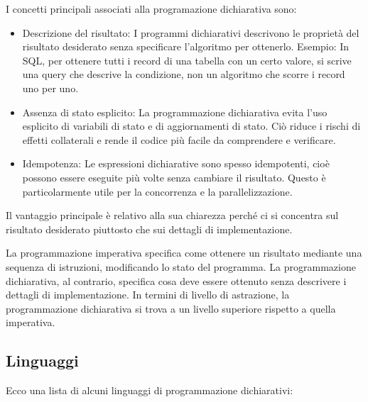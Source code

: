 \documentclass[
  letterpaper,
]{scrbook}
\begin{document}
I concetti principali associati alla programazione dichiarativa sono:

\begin{itemize}
\item
  Descrizione del risultato: I programmi dichiarativi descrivono le
  proprietà del risultato desiderato senza specificare l'algoritmo per
  ottenerlo. Esempio: In SQL, per ottenere tutti i record di una tabella
  con un certo valore, si scrive una query che descrive la condizione,
  non un algoritmo che scorre i record uno per uno.
\item
  Assenza di stato esplicito: La programmazione dichiarativa evita l'uso
  esplicito di variabili di stato e di aggiornamenti di stato. Ciò
  riduce i rischi di effetti collaterali e rende il codice più facile da
  comprendere e verificare.
\item
  Idempotenza: Le espressioni dichiarative sono spesso idempotenti, cioè
  possono essere eseguite più volte senza cambiare il risultato. Questo
  è particolarmente utile per la concorrenza e la parallelizzazione.
\end{itemize}

Il vantaggio principale è relativo alla sua chiarezza perché ci si
concentra sul risultato desiderato piuttosto che sui dettagli di
implementazione.

La programmazione imperativa specifica come ottenere un risultato
mediante una sequenza di istruzioni, modificando lo stato del programma.
La programmazione dichiarativa, al contrario, specifica cosa deve essere
ottenuto senza descrivere i dettagli di implementazione. In termini di
livello di astrazione, la programmazione dichiarativa si trova a un
livello superiore rispetto a quella imperativa.

\subsection{Linguaggi}\label{linguaggi}

Ecco una lista di alcuni linguaggi di programmazione dichiarativi:
\end{document}
